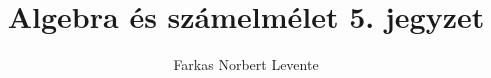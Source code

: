 \documentclass[12pt]{book}
\theoremstyle{plain} %
\theoremstyle{definition} %
\theoremstyle{remark}
\numberwithin{equation}{section}  %
\begin{document}
	
	\author{Farkas Norbert Levente}
	\title{Algebra és számelmélet 5. jegyzet}
	\maketitle
	\tableofcontents
	\newpage
	
	\renewcommand{\chaptername}{előadás}

	\newpage
\end{document}
